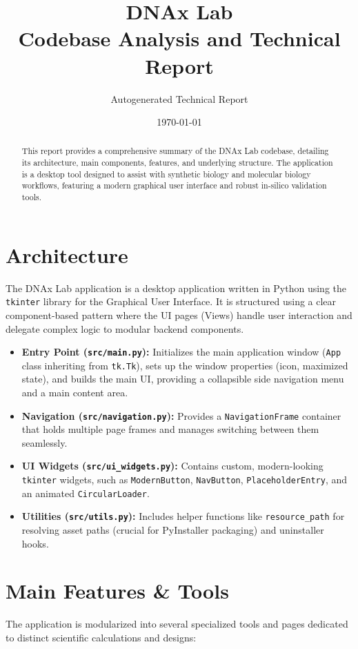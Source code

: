 \documentclass[12pt]{article}
\title{DNAx Lab \\ \large Codebase Analysis and Technical Report}
\author{Autogenerated Technical Report}
\date{\today}
\begin{document}
\maketitle

\begin{abstract}
This report provides a comprehensive summary of the DNAx Lab codebase, detailing its architecture, main components, features, and underlying structure. The application is a desktop tool designed to assist with synthetic biology and molecular biology workflows, featuring a modern graphical user interface and robust in-silico validation tools.
\end{abstract}

\section{Architecture}
The DNAx Lab application is a desktop application written in Python using the \texttt{tkinter} library for the Graphical User Interface. It is structured using a clear component-based pattern where the UI pages (Views) handle user interaction and delegate complex logic to modular backend components.

\begin{itemize}
    \item \textbf{Entry Point (\texttt{src/main.py}):} Initializes the main application window (\texttt{App} class inheriting from \texttt{tk.Tk}), sets up the window properties (icon, maximized state), and builds the main UI, providing a collapsible side navigation menu and a main content area.
    \item \textbf{Navigation (\texttt{src/navigation.py}):} Provides a \texttt{NavigationFrame} container that holds multiple page frames and manages switching between them seamlessly.
    \item \textbf{UI Widgets (\texttt{src/ui\_widgets.py}):} Contains custom, modern-looking \texttt{tkinter} widgets, such as \texttt{ModernButton}, \texttt{NavButton}, \texttt{PlaceholderEntry}, and an animated \texttt{CircularLoader}.
    \item \textbf{Utilities (\texttt{src/utils.py}):} Includes helper functions like \texttt{resource\_path} for resolving asset paths (crucial for PyInstaller packaging) and uninstaller hooks.
\end{itemize}

\section{Main Features \& Tools}
The application is modularized into several specialized tools and pages dedicated to distinct scientific calculations and designs:
\end{document}
